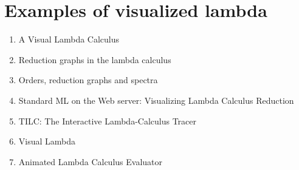 
\chapter{Examples of visualized lambda}\label{app:a}

\begin{enumerate}
	\item A Visual Lambda Calculus \cite{Citrin+Hall+Zorn+1995a}
	\item Reduction graphs in the lambda calculus \cite{VenturiniZilli1984251}
	\item Orders, reduction graphs and spectra \cite{297368}
	\item Standard ML on the Web server: Visualizing Lambda Calculus Reduction \cite{Sestoft96standardml}
	\item TILC: The Interactive Lambda-Calculus Tracer \cite{DBLP:journals/entcs/RuizV09}
	\item Visual Lambda \cite{visual-lambda}
	\item Animated Lambda Calculus Evaluator \cite{AnimatedLambdaCalculusEvaluator}
\end{enumerate}